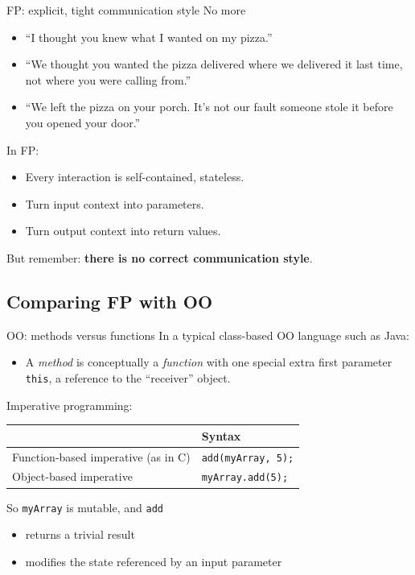 \begin{frame}{FP: explicit, tight communication style}
  No more
  \begin{itemize}
  \item ``I thought you knew what I wanted on my pizza.''
  \item ``We thought you wanted the pizza delivered where we delivered
    it last time, not where you were calling from.''
\item ``We left the pizza on your porch. It's not our fault someone
  stole it before you opened your door.''
  \end{itemize}

  In FP:
  \begin{itemize}
  \item Every interaction is self-contained, stateless.
  \item Turn input context into parameters.
  \item Turn output context into return values.
  \end{itemize}

  But remember: \textbf{there is no correct communication style}.
\end{frame}

\subsection{Comparing FP with OO}

\begin{frame}[fragile]{OO: methods versus functions}
  In a typical class-based OO language such as Java:
  \begin{itemize}
  \item A \emph{method} is conceptually a \emph{function} with one
    special extra first parameter \texttt{this}, a reference
    to the ``receiver'' object.
  \end{itemize}

  Imperative programming:
  \begin{table}
    \begin{tabular}{| l || l |}
      \toprule
      & Syntax \\
      \midrule
        Function-based imperative (as in C) & \texttt{add(myArray, 5);} \\
        Object-based imperative & \texttt{myArray.add(5);} \\
      \bottomrule
    \end{tabular}
  \end{table}

  So \texttt{myArray} is mutable, and \texttt{add}
  \begin{itemize}
  \item returns a trivial result
  \item modifies the state referenced by an input parameter
  \end{itemize}
\end{frame}

